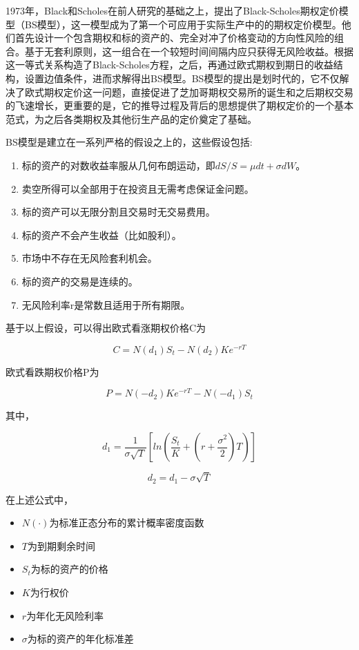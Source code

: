 1973年，Black和Scholes在前人研究的基础之上，提出了Black-Scholes期权定价模型（BS模型），这一模型成为了第一个可应用于实际生产中的的期权定价模型。他们首先设计一个包含期权和标的资产的、完全对冲了价格变动的方向性风险的组合。基于无套利原则，这一组合在一个较短时间间隔内应只获得无风险收益。根据这一等式关系构造了Black-Scholes方程，之后，再通过欧式期权到期日的收益结构，设置边值条件，进而求解得出BS模型。BS模型的提出是划时代的，它不仅解决了欧式期权定价这一问题，直接促进了芝加哥期权交易所的诞生和之后期权交易的飞速增长，更重要的是，它的推导过程及背后的思想提供了期权定价的一个基本范式，为之后各类期权及其他衍生产品的定价奠定了基础。

BS模型是建立在一系列严格的假设之上的，这些假设包括:

\begin{enumerate}
    \item 标的资产的对数收益率服从几何布朗运动，即$dS/S=\mu dt+\sigma dW$。
    \item 卖空所得可以全部用于在投资且无需考虑保证金问题。
    \item 标的资产可以无限分割且交易时无交易费用。
    \item 标的资产不会产生收益（比如股利）。
    \item 市场中不存在无风险套利机会。
    \item 标的资产的交易是连续的。
    \item 无风险利率r是常数且适用于所有期限。
\end{enumerate}

基于以上假设，可以得出欧式看涨期权价格C为

\begin{equation}
  C=N(d_1)S_t-N(d_2)Ke^{-rT}
\end{equation}

欧式看跌期权价格P为

\begin{equation}
  P=N(-d_2)Ke^{-rT}-N(-d_1)S_t
\end{equation}

其中，

\begin{equation}
  d_1=\frac{1}{\sigma \sqrt{T}}[ln(\frac{S_t}{K}+(r+\frac{\sigma ^2}{2})T)]
\end{equation}

\begin{equation}
  d_2=d_1-\sigma \sqrt{T}
\end{equation}

在上述公式中，

\begin{itemize}
  \item $N(\cdot)$为标准正态分布的累计概率密度函数
  \item $T$为到期剩余时间
  \item $S_t$为标的资产的价格
  \item $K$为行权价
  \item $r$为年化无风险利率
  \item $\sigma$为标的资产的年化标准差
\end{itemize}

